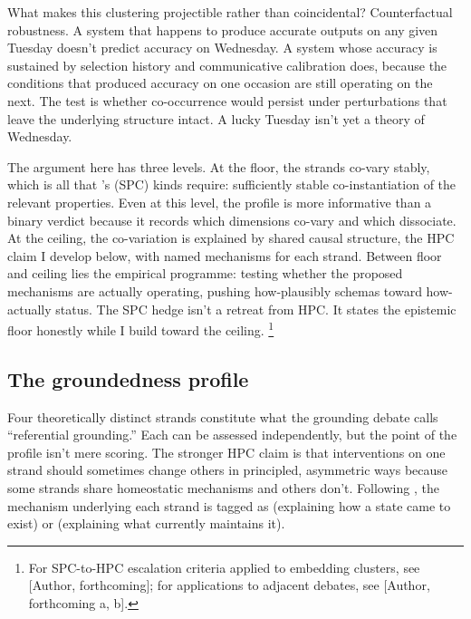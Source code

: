 \documentclass[12pt]{article}
\begin{document}
What makes this clustering projectible rather than coincidental? Counterfactual robustness. A system that happens to produce accurate outputs on any given Tuesday doesn't predict accuracy on Wednesday. A system whose accuracy is sustained by selection history and communicative calibration does, because the conditions that produced accuracy on one occasion are still operating on the next. The test is whether co-occurrence would persist under perturbations that leave the underlying structure intact. A lucky Tuesday isn't yet a theory of Wednesday.

The argument here has three levels. At the floor, the strands co-vary stably, which is all that \textcite{slater_2015_natural_kindness}'s  (SPC) kinds require: sufficiently stable co-instantiation of the relevant properties.
Even at this level, the profile is more informative than a binary verdict because it records which dimensions co-vary and which dissociate. At the ceiling, the co-variation is explained by shared causal structure, the HPC claim I develop below, with named mechanisms for each strand. Between floor and ceiling lies the empirical programme: testing whether the proposed mechanisms are actually operating, pushing how-plausibly schemas toward how-actually status. The SPC hedge isn't a retreat from HPC. It states the epistemic floor honestly while I build toward the ceiling.%
\footnote{For SPC-to-HPC escalation criteria applied to embedding clusters, see [Author, forthcoming]; for applications to adjacent debates, see [Author, forthcoming a, b].}

\subsection{The groundedness profile}
\label{sec:predictions}

Four theoretically distinct strands constitute what the grounding debate calls \enquote{referential grounding.} Each can be assessed independently, but the point of the profile isn't mere scoring. The stronger HPC claim is that interventions on one strand should sometimes change others in principled, asymmetric ways because some strands share homeostatic mechanisms and others don't. Following \textcite[125]{glennan_2017_new_mechanical_philosophy}, the mechanism underlying each strand is tagged as  (explaining how a state came to exist) or  (explaining what currently maintains it).
\end{document}
